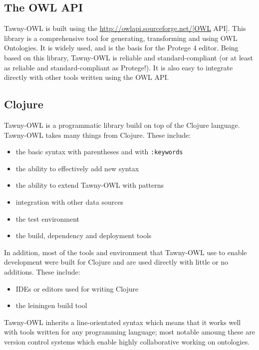 \documentclass[11pt]{article}
\begin{document}
\subsection{The OWL API}
\label{sec-3-1}

Tawny-OWL is built using the \url{http://owlapi.sourceforge.net/[OWL} API].
This library is a comprehensive tool for generating, transforming and
using OWL Ontologies. It is widely used, and is the basis for the
Protege 4 editor. Being based on this library, Tawny-OWL is reliable and
standard-compliant (or at least as reliable and standard-compliant as
Protege!). It is also easy to integrate directly with other tools
written using the OWL API.

\subsection{Clojure}
\label{sec-3-2}

Tawny-OWL is a programmatic library build on top of the Clojure
language. Tawny-OWL takes many things from Clojure. These include:

\begin{itemize}
\item the basic syntax with parentheses and with \texttt{:keywords}
\item the ability to effectively add new syntax
\item the ability to extend Tawny-OWL with patterns
\item integration with other data sources
\item the test environment
\item the build, dependency and deployment tools
\end{itemize}

In addition, most of the tools and environment that Tawny-OWL use to
enable development were built for Clojure and are used directly with
little or no additions. These include:

\begin{itemize}
\item IDEs or editors used for writing Clojure
\item the leiningen build tool
\end{itemize}

Tawny-OWL inherits a line-orientated syntax which means that it works
well with tools written for any programming language; most notable
amoung these are version control systems which enable highly
collaborative working on ontologies.
\end{document}
